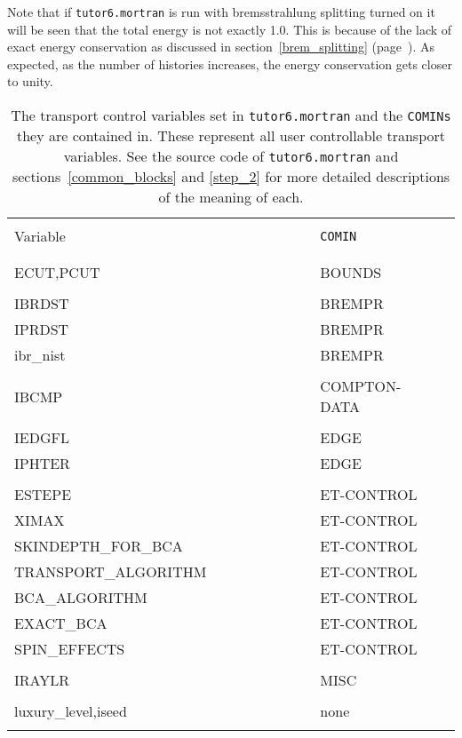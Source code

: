 Note that if {\tt tutor6.mortran} is run with bremsstrahlung splitting
turned on it will be seen that the total energy is not exactly 1.0. This
is because of the lack of exact energy conservation as discussed in
section~\ref{brem_splitting} (page~\pageref{brem_splitting}). As expected,
as the number of histories increases, the energy conservation gets closer
to unity.

\begin{table}
\begin{center}
\caption{The transport control variables set in {\tt tutor6.mortran} and
the {\tt COMINs} they are contained in. These represent all user controllable
transport variables. See the source code of
{\tt tutor6.mortran} and
sections~\ref{common_blocks} and \ref{step_2}
for more detailed descriptions of the meaning of each.\vspace{3mm} }
\label{tab_tutor6}
\begin{tabular}{ll}
\hline
&\\
Variable & {\tt COMIN} \\
&\\
\hline
&\\
ECUT,PCUT   &  BOUNDS\\
&\\
IBRDST      & BREMPR\\
IPRDST       & BREMPR\\
ibr\_nist     & BREMPR \\
&\\
IBCMP        & COMPTON-DATA~~~~~~~~~\\
&\\
IEDGFL      & EDGE\\
IPHTER      & EDGE\\
&\\
ESTEPE      & ET-CONTROL \\
XIMAX			&ET-CONTROL \\
SKINDEPTH\_FOR\_BCA	&ET-CONTROL \\
TRANSPORT\_ALGORITHM~~~~~~~~~~~~~~	&ET-CONTROL \\
BCA\_ALGORITHM		&ET-CONTROL \\
EXACT\_BCA		&ET-CONTROL \\
SPIN\_EFFECTS		&ET-CONTROL \\
&\\
IRAYLR   		&MISC\\
&\\
luxury\_level,iseed      & none \\
&\\
\hline
\end{tabular}
\end{center}
\end{table}


